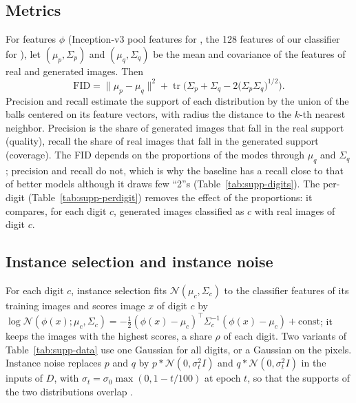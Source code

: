 \subsection{Metrics}
\label{app:metrics}
For features $\phi$ (Inception-v3 pool features for \finc{}, the 128 features of our classifier for \fcnn{}), let $(\mu_p,\Sigma_p)$ and $(\mu_q,\Sigma_q)$ be the mean and covariance of the features of real and generated images. Then \cite{heusel2017}
\begin{equation}
  \mathrm{FID}=\|\mu_p-\mu_q\|^2+\operatorname{tr}\Big(\Sigma_p+\Sigma_q-2\big(\Sigma_p\Sigma_q\big)^{1/2}\Big).
\end{equation}
Precision and recall \cite{kynkaanniemi2019} estimate the support of each distribution by the union of the balls centered on its feature vectors, with radius the distance to the $k$-th nearest neighbor. Precision is the share of generated images that fall in the real support (quality), recall the share of real images that fall in the generated support (coverage). The FID depends on the proportions of the modes through $\mu_q$ and $\Sigma_q$; precision and recall do not, which is why the baseline has a recall close to that of better models although it draws few ``2''s (Table~\ref{tab:supp-digits}). The per-digit \finc{} (Table~\ref{tab:supp-perdigit}) removes the effect of the proportions: it compares, for each digit $c$, generated images classified as $c$ with real images of digit $c$.

\subsection{Instance selection and instance noise}
For each digit $c$, instance selection fits $\mathcal N(\mu_c,\Sigma_c)$ to the classifier features of its training images and scores image $x$ of digit $c$ by $\log\mathcal N(\phi(x);\mu_c,\Sigma_c)=-\frac12(\phi(x)-\mu_c)^\top\Sigma_c^{-1}(\phi(x)-\mu_c)+\mathrm{const}$; it keeps the images with the highest scores, a share $\rho$ of each digit. Two variants of Table~\ref{tab:supp-data} use one Gaussian for all digits, or a Gaussian on the pixels. Instance noise replaces $p$ and $q$ by $p*\mathcal N(0,\sigma_t^2I)$ and $q*\mathcal N(0,\sigma_t^2I)$ in the inputs of $D$, with $\sigma_t=\sigma_0\max(0,1-t/100)$ at epoch $t$, so that the supports of the two distributions overlap \cite{sonderby2017,arjovsky2017}.

